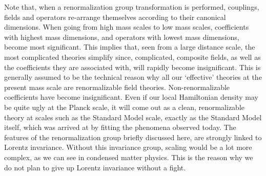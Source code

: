 \documentclass[main.tex]{subfiles}
\begin{document}
Note that, when a renormalization group transformation is performed, couplings, fields and operators re-arrange themselves according to their canonical dimensions. When going from high mass scales to low mass scales, coefficients with highest mass dimensions, and operators with lowest mass dimensions, become most significant. This implies that, seen from a large distance scale, the most complicated theories simplify since, complicated, composite fields, as well as the coefficients they are associated with, will rapidly become insignificant. This is generally assumed to be the technical reason why all our ‘effective’ theories at the present mass scale are renormalizable field theories. Non-renormalizable coefficients have become insignificant. Even if our local Hamiltonian density may be quite ugly at the
Planck scale, it will come out as a clean, renormalizable theory at scales such as the Standard Model scale, exactly as the Standard Model itself, which was arrived at by fitting the phenomena observed today.
The features of the renormalization group briefly discussed here, are strongly linked to Lorentz invariance. Without this invariance group, scaling would be a lot more complex, as we can see in condensed matter physics. This is the reason why we do not plan to give up Lorentz invariance without a fight.






\begin{equation}\label{20.}
	
\end{equation}
\end{document}
